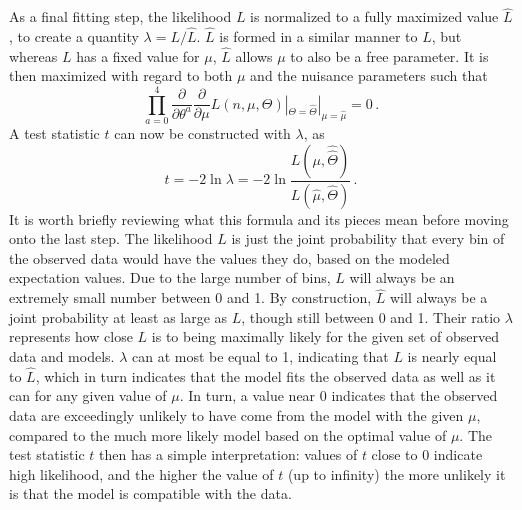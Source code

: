     As a final fitting step, the likelihood $L$ is normalized to a fully maximized value $\hat L$,
        to create a quantity $\lambda = L / \hat L$.
    $\hat L$ is formed in a similar manner to $L$, but whereas $L$ has a fixed value for $\mu$,
        $\hat L$ allows $\mu$ to also be a free parameter.
    It is then maximized with regard to both $\mu$ and the nuisance parameters such that
    \begin{equation}
        \prod \limits_{a=0}^{4} \frac{\partial}{\partial \theta^a} \frac{\partial}{\partial \mu} L(n,\mu,\Theta) |_{\Theta=\hat \Theta} |_{\mu=\hat \mu} = 0
        \,.
    \end{equation}
    A test statistic $t$ can now be constructed with $\lambda$, as
    \begin{equation}
        t = -2 \ln{\lambda} = -2 \ln{\frac{L(\mu, \hat {\hat \Theta})}{L(\hat \mu, \hat \Theta)}}
        \,.
    \end{equation}
    It is worth briefly reviewing what this formula and its pieces mean before moving onto the last step.
    The likelihood $L$ is just the joint probability that every bin of the observed data would have the values they do,
        based on the modeled expectation values.
    Due to the large number of bins, $L$ will always be an extremely small number between 0 and 1.
    By construction, $\hat L$ will always be a joint probability at least as large as $L$, though still between 0 and 1.
    Their ratio $\lambda$ represents how close $L$ is to being maximally likely for the given set of observed data and models.
    $\lambda$ can at most be equal to 1, indicating that $L$ is nearly equal to $\hat L$,
        which in turn indicates that the model fits the observed data as well as it can for any given value of $\mu$.
    In turn, a value near 0 indicates that the observed data are exceedingly unlikely to have come from the model with the given $\mu$,
        compared to the much more likely model based on the optimal value of $\mu$.
    The test statistic $t$ then has a simple interpretation:
        values of $t$ close to 0 indicate high likelihood,
        and the higher the value of $t$ (up to infinity) the more unlikely it is that the model is compatible with the data.

